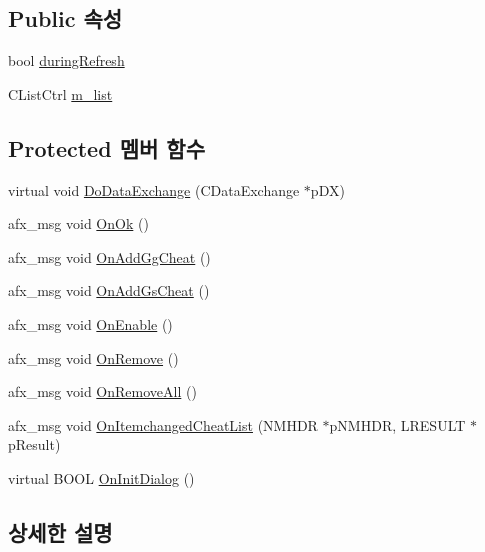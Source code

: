 \subsection*{Public 속성}
\begin{DoxyCompactItemize}
\item 
bool \mbox{\hyperlink{class_g_b_cheat_list_aba5dc0a50355411fd9c82f87fbdbeb2e}{during\+Refresh}}
\item 
C\+List\+Ctrl \mbox{\hyperlink{class_g_b_cheat_list_aca0eaf2ff30100f5d11e4c80193ad90e}{m\+\_\+list}}
\end{DoxyCompactItemize}
\subsection*{Protected 멤버 함수}
\begin{DoxyCompactItemize}
\item 
virtual void \mbox{\hyperlink{class_g_b_cheat_list_ab521fa9ea4378fa0d15b4f61a6e7f965}{Do\+Data\+Exchange}} (C\+Data\+Exchange $\ast$p\+DX)
\item 
afx\+\_\+msg void \mbox{\hyperlink{class_g_b_cheat_list_a354069c10c3804094ce2b4079588115e}{On\+Ok}} ()
\item 
afx\+\_\+msg void \mbox{\hyperlink{class_g_b_cheat_list_a9bb70cfb03b60aae7f599000144df75e}{On\+Add\+Gg\+Cheat}} ()
\item 
afx\+\_\+msg void \mbox{\hyperlink{class_g_b_cheat_list_a50f8baaa9c1fc25bbddc698d1679b4c3}{On\+Add\+Gs\+Cheat}} ()
\item 
afx\+\_\+msg void \mbox{\hyperlink{class_g_b_cheat_list_a3a9af133cd9547881b6f71404ab9171f}{On\+Enable}} ()
\item 
afx\+\_\+msg void \mbox{\hyperlink{class_g_b_cheat_list_ae8c2c668dbb6ab9989c50efc60448a54}{On\+Remove}} ()
\item 
afx\+\_\+msg void \mbox{\hyperlink{class_g_b_cheat_list_a572e8d726efb4dcaed99de7b7f1a815d}{On\+Remove\+All}} ()
\item 
afx\+\_\+msg void \mbox{\hyperlink{class_g_b_cheat_list_a35c4625f3b1696bf7647d23831ae310b}{On\+Itemchanged\+Cheat\+List}} (N\+M\+H\+DR $\ast$p\+N\+M\+H\+DR, L\+R\+E\+S\+U\+LT $\ast$p\+Result)
\item 
virtual B\+O\+OL \mbox{\hyperlink{class_g_b_cheat_list_a3adbb125356d48a379d2e60609fb775f}{On\+Init\+Dialog}} ()
\end{DoxyCompactItemize}


\subsection{상세한 설명}


